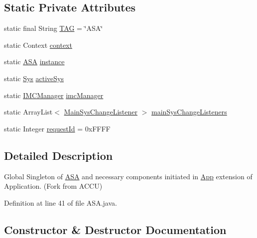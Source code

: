 \subsection*{Static Private Attributes}
\begin{DoxyCompactItemize}
\item 
static final String \hyperlink{classpt_1_1lsts_1_1asa_1_1ASA_acbc3f54345385bf9a149020e88ff8f9d}{T\+A\+G} = \char`\"{}A\+S\+A\char`\"{}
\item 
static Context \hyperlink{classpt_1_1lsts_1_1asa_1_1ASA_ad16e2c7db27b0a63a471c62f1fdcc1df}{context}
\item 
static \hyperlink{classpt_1_1lsts_1_1asa_1_1ASA}{A\+S\+A} \hyperlink{classpt_1_1lsts_1_1asa_1_1ASA_aa2d7c4c00a6fe360e39facc220d35d23}{instance}
\item 
static \hyperlink{classpt_1_1lsts_1_1asa_1_1sys_1_1Sys}{Sys} \hyperlink{classpt_1_1lsts_1_1asa_1_1ASA_aa3882391994a66fbda943030282f5d20}{active\+Sys}
\item 
static \hyperlink{classpt_1_1lsts_1_1asa_1_1managers_1_1IMCManager}{I\+M\+C\+Manager} \hyperlink{classpt_1_1lsts_1_1asa_1_1ASA_a767130ab277b7f44d350625b5f1bcda3}{imc\+Manager}
\item 
static Array\+List$<$ \hyperlink{interfacept_1_1lsts_1_1asa_1_1listenners_1_1MainSysChangeListener}{Main\+Sys\+Change\+Listener} $>$ \hyperlink{classpt_1_1lsts_1_1asa_1_1ASA_afb8ea93835a90aa2b9ad4fa39321f784}{main\+Sys\+Change\+Listeners}
\item 
static Integer \hyperlink{classpt_1_1lsts_1_1asa_1_1ASA_a377d6b4e9ec10904dd211d16eb724cc8}{request\+Id} = 0x\+F\+F\+F\+F
\end{DoxyCompactItemize}


\subsection{Detailed Description}
Global Singleton of \hyperlink{classpt_1_1lsts_1_1asa_1_1ASA}{A\+S\+A} and necessary components initiated in \hyperlink{classpt_1_1lsts_1_1asa_1_1App}{App} extension of Application. (Fork from A\+C\+C\+U) 

Definition at line 41 of file A\+S\+A.\+java.



\subsection{Constructor \& Destructor Documentation}
\hypertarget{classpt_1_1lsts_1_1asa_1_1ASA_a60a8551e0d2c3897887ff8e560b937ab}{}
